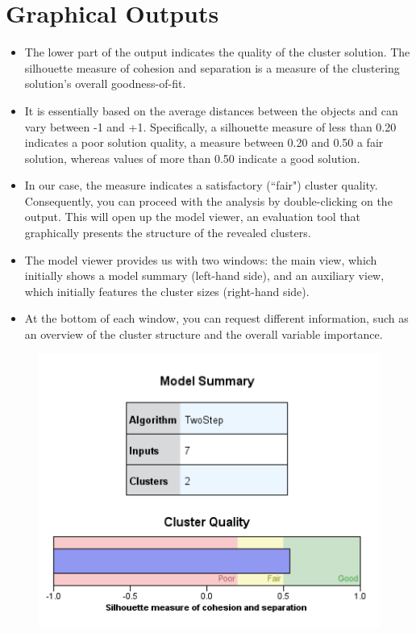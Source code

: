 \documentclass[a4paper,12pt]{article}
\begin{document}
\section{Graphical Outputs}
\begin{itemize}
    \item 
The lower part of the output  indicates the quality of the cluster
solution. The silhouette measure of cohesion and separation is a measure of the
clustering solution’s overall goodness-of-fit. 
\item It is essentially based on the average
distances between the objects and can vary between -1 and +1. Specifically, a
silhouette measure of less than 0.20 indicates a poor solution quality, a measure
between 0.20 and 0.50 a fair solution, whereas values of more than 0.50 indicate a
good solution. 
\item In our case, the measure indicates a satisfactory (``fair") cluster quality. Consequently, you can
proceed with the analysis by double-clicking on the output. This will open up the
model viewer, an evaluation tool that graphically presents the structure
of the revealed clusters.
\item 

The model viewer provides us with two windows: the main view, which initially
shows a model summary (left-hand side), and an auxiliary view, which initially
features the cluster sizes (right-hand side).
\item At the bottom of each window, you can
request different information, such as an overview of the cluster structure and the
overall variable importance.
\end{itemize}
\begin{figure}
\centering
\includegraphics[width=0.7\linewidth]{images/silhouette}
\caption{}
\label{fig:silhouette}
\end{figure}
\end{document}
